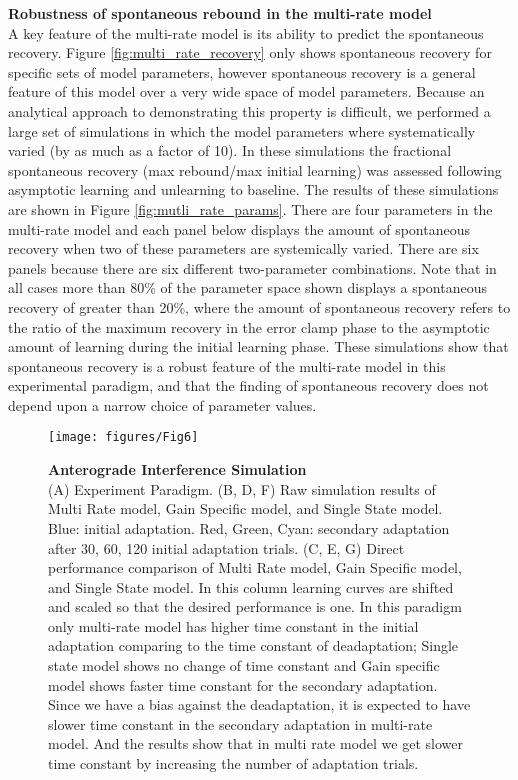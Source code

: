 \documentclass[9pt,twocolumn]{paper-template}
\begin{document}
\textbf{Robustness of spontaneous rebound in the multi-rate model}\\
A key feature of the multi-rate model is its ability to predict the spontaneous recovery. Figure \ref{fig:multi_rate_recovery} only shows spontaneous recovery for
specific sets of model parameters, however spontaneous recovery is a general feature of this
model over a very wide space of model parameters. Because an analytical approach to
demonstrating this property is difficult, we performed a large set of simulations in which the
model parameters where systematically varied (by as much as a factor of 10). In these simulations the fractional spontaneous
recovery (max rebound/max initial learning) was assessed following asymptotic learning and
unlearning to baseline. The results of these simulations are shown in Figure \ref{fig:mutli_rate_params}. There are four
parameters in the multi-rate model and each panel below displays the amount of
spontaneous recovery when two of these parameters are systemically varied. There are six
panels because there are six different two-parameter combinations. Note that in all cases
more than 80\% of the parameter space shown displays a spontaneous recovery of greater
than 20\%, where the amount of spontaneous recovery refers to the ratio of the maximum
recovery in the error clamp phase to the asymptotic amount of learning during the initial
learning phase. These simulations show that spontaneous recovery is a robust feature of
the multi-rate model in this experimental paradigm, and that the finding of spontaneous
recovery does not depend upon a narrow choice of parameter values.

\begin{figure}[h!]
  \centering
     \texttt{[image: figures/Fig6]}
  \caption{\textbf{Anterograde Interference Simulation}\\(A)  Experiment Paradigm. (B, D, F) Raw simulation results of Multi Rate model, Gain Specific model, and Single State model. Blue: initial adaptation. Red, Green, Cyan: secondary adaptation after 30, 60, 120 initial adaptation trials. (C, E, G) Direct performance comparison of Multi Rate model, Gain Specific model, and Single State model. In this column learning curves are shifted and scaled so that the desired performance is one. In this paradigm only multi-rate model has higher time constant in the initial adaptation comparing to the time constant of deadaptation; Single state model shows no change of time constant and Gain specific model shows faster time constant for the secondary adaptation. Since we have a bias against the deadaptation, it is expected to have slower time constant in the secondary adaptation in multi-rate model. And the results show that in multi rate model we get slower time constant by increasing the number of adaptation trials. 
}
  \label{fig:Anterograde_Interference_Simulation}
\end{figure}
\end{document}
